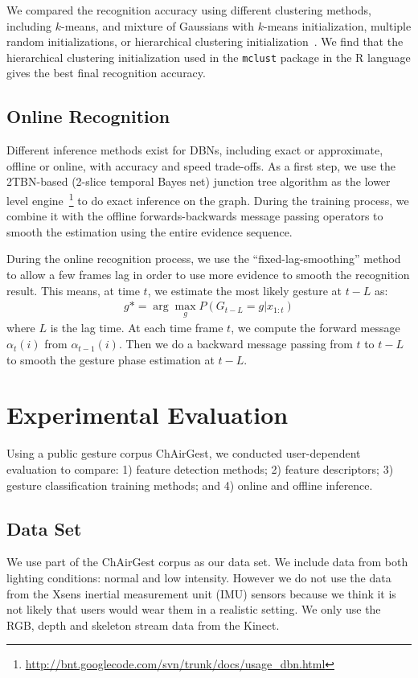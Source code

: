 \documentclass{sigchi}
\begin{document}
We compared the recognition accuracy using different clustering methods, including $k$-means,
and mixture of Gaussians with $k$-means initialization, multiple random
initializations, or hierarchical clustering initialization~\cite{Fraley:2003}. We
find that the hierarchical clustering initialization used in the \texttt{mclust} package in the R
language gives the best final recognition accuracy.

\subsection{Online Recognition}
Different inference methods exist for DBNs, including exact or approximate, offline or
online, with accuracy and speed trade-offs. As a first step, we use the
2TBN-based (2-slice temporal Bayes net) junction tree algorithm as the lower
level 
engine~\footnote{\url{http://bnt.googlecode.com/svn/trunk/docs/usage_dbn.html}}
to do exact inference on the graph. During the training process, we combine it
with the offline forwards-backwards message passing operators to smooth the
estimation using the entire evidence sequence.

During the online recognition process, we use the ``fixed-lag-smoothing''
method~\cite{murphy02} to allow a few frames lag in order to use more evidence to smooth the recognition result. This means, at time $t$,  we estimate the most likely
gesture at $t - L$ as:
\begin{align}
g* = \arg\max_g P(G_{t-L} = g | x_{1:t})
\end{align}
where $L$ is the lag time. At each time frame $t$, we compute the forward
message $\alpha_t(i)$ from $\alpha_{t-1}(i)$. Then we do a backward message passing
from $t$ to $t-L$ to smooth the gesture phase estimation at $t - L$.

\section{Experimental Evaluation}
Using a public gesture corpus
ChAirGest\cite{Ruffieux2013}, 
we conducted user-dependent evaluation to compare: 1)
feature detection methods; 2) feature descriptors; 3) gesture classification training
methods; and 4) online and offline inference.

\subsection{Data Set}
We use part of the ChAirGest corpus as our data set. We include data from
both lighting conditions: normal and low intensity. However we do not use the
data from the Xsens inertial measurement unit (IMU) sensors because we
think it is not likely that users would wear them in a realistic setting. We
only use the RGB, depth and skeleton stream data from the Kinect.
\end{document}
